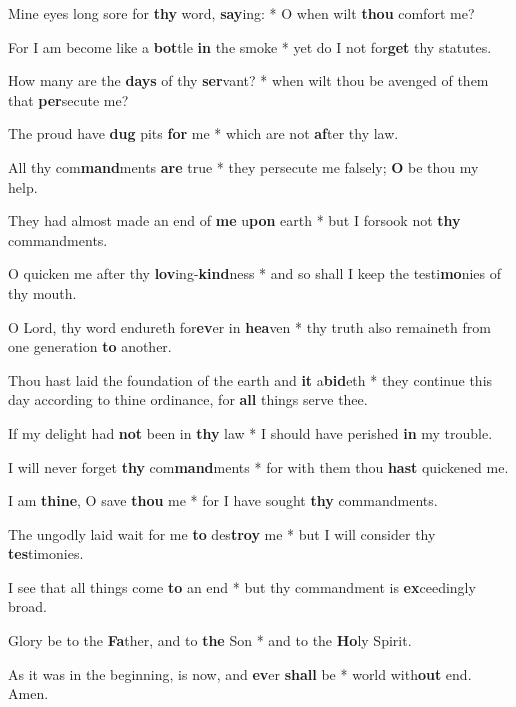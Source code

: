 \begin{multicols}{2}
	Mine eyes long sore for \textbf{thy} word, \textbf{say}ing: * O when wilt \textbf{thou} comfort me?
	
	For I am become like a \textbf{bot}tle \textbf{in} the smoke * yet do I not for\textbf{get} thy statutes.
	
	How many are the \textbf{days} of thy \textbf{ser}vant? * when wilt thou be avenged of them that \textbf{per}secute me?
	
	The proud have \textbf{dug} pits \textbf{for} me * which are not \textbf{af}ter thy law.
	
	All thy com\textbf{mand}ments \textbf{are} true * they persecute me falsely; \textbf{O} be thou my help.
	
	They had almost made an end of \textbf{me} u\textbf{pon} earth * but I forsook not \textbf{thy} commandments.
	
	O quicken me after thy \textbf{lov}ing-\textbf{kind}ness * and so shall I keep the testi\textbf{mo}nies of thy mouth.
	
	O Lord, thy word endureth for\textbf{ev}er in \textbf{hea}ven * thy truth also remaineth from one generation \textbf{to} another.
	
	Thou hast laid the foundation of the earth and \textbf{it} a\textbf{bid}eth * they continue this day according to thine ordinance, for \textbf{all} things serve thee.
	
	If my delight had \textbf{not} been in \textbf{thy} law * I should have perished \textbf{in} my trouble.
	
	I will never forget \textbf{thy} com\textbf{mand}ments * for with them thou \textbf{hast} quickened me.
	
	I am \textbf{thine}, O save \textbf{thou} me * for I have sought \textbf{thy} commandments.
	
	The ungodly laid wait for me \textbf{to} des\textbf{troy} me * but I will consider thy \textbf{tes}timonies.
	
	I see that all things come \textbf{to} an end * but thy commandment is \textbf{ex}ceedingly broad.
	
	Glory be to the \textbf{Fa}ther, and to \textbf{the} Son * and to the \textbf{Ho}ly Spirit.
	
	As it was in the beginning, is now, and \textbf{ev}er \textbf{shall} be * world with\textbf{out} end. Amen.
\end{multicols}